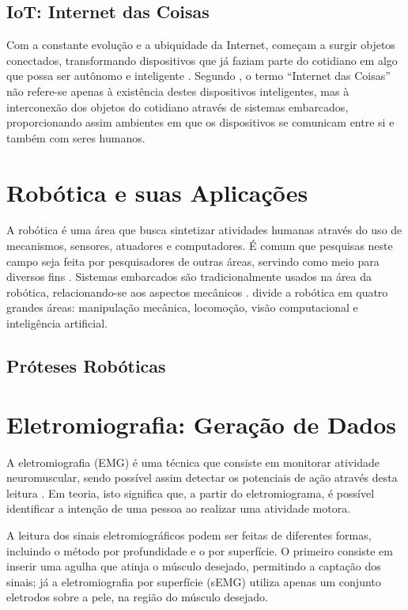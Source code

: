 \subsection{IoT: Internet das Coisas}
Com a constante evolução e a ubiquidade da Internet, começam a surgir objetos conectados, transformando dispositivos que já faziam parte do cotidiano em algo que possa ser autônomo e inteligente \cite{kopetz:2011}.  Segundo , o termo ``Internet das Coisas''  não refere-se apenas à existência destes dispositivos inteligentes, mas à interconexão dos objetos do cotidiano através de sistemas embarcados, proporcionando assim ambientes em que os dispositivos se comunicam entre si e também com seres humanos.

\section{Robótica e suas Aplicações}
A robótica é uma área que busca sintetizar atividades humanas através do uso de mecanismos, sensores, atuadores e computadores. É comum que pesquisas neste campo seja feita por pesquisadores de outras áreas, servindo como meio para diversos fins \cite{craig:2005}. Sistemas embarcados são tradicionalmente usados na área da robótica, relacionando-se aos aspectos mecânicos \cite{marwedel:2010}.  divide a robótica em quatro grandes áreas: manipulação mecânica, locomoção, visão computacional e inteligência artificial.
\label{sec:robotica}
\subsection{Próteses Robóticas}

\section{Eletromiografia: Geração de Dados}
\label{sec:emg}
A eletromiografia (EMG) é uma técnica que consiste em monitorar atividade neuromuscular, sendo possível assim detectar os potenciais de ação através desta leitura \cite{deluca:1979}. Em teoria, isto significa que, a partir do eletromiograma, é possível identificar a intenção de uma pessoa ao realizar uma atividade motora.

A leitura dos sinais eletromiográficos podem ser feitas de diferentes formas, incluindo o método por profundidade e o por superfície. O primeiro consiste em inserir uma agulha que atinja o músculo desejado, permitindo a captação dos sinais; já a eletromiografia por superfície (sEMG) utiliza apenas um conjunto eletrodos sobre a pele, na região do músculo desejado.

